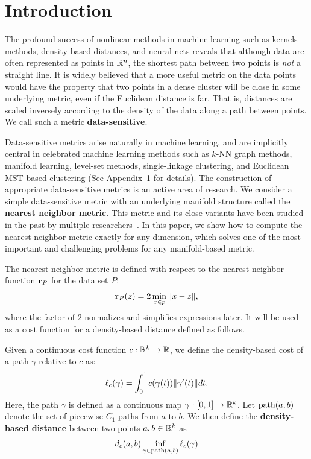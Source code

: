 \section{Introduction}

The profound success of nonlinear methods in machine learning such as kernels methods, density-based distances, and neural nets reveals that although data are often represented as points in $\mathbb{R}^n$, the shortest path between two points is \emph{not} a straight line.
It is widely believed that a more useful metric on the data points would have the property that two points in a dense cluster will be close in some underlying metric, even if the Euclidean distance is far.
That is, distances are scaled inversely according to the density of the data along a path between points.
We call such a metric \textbf{data-sensitive}.

Data-sensitive metrics arise naturally in machine learning, and are implicitly central in celebrated machine learning methods such as $k$-NN graph methods, manifold learning, level-set methods, single-linkage clustering, and Euclidean MST-based clustering (See Appendix~\ref{} for details).
The construction of appropriate data-sensitive metrics is an active area of research.
We consider a simple data-sensitive metric with an underlying manifold structure called the \textbf{nearest neighbor metric}.
This metric and its close variants have been studied in the past by multiple researchers~\cite{}.
In this paper, we show how to compute the nearest neighbor metric exactly for any dimension, which solves one of the most important and challenging problems for any manifold-based metric.

The nearest neighbor metric is defined with respect to the nearest neighbor function $\mathbf{r}_P$ for the data set $P$:
\[
\mathbf{r}_P(z) = 2\min_{x\in p} \|x-z\|,
\]
where the factor of $2$ normalizes and simplifies expressions later.
It will be used as a cost function for a density-based distance defined as follows.

\begin{definition}
Given a continuous cost function $c:\mathbb{R}^k \rightarrow \mathbb{R}$, we define the density-based
cost of a path $\gamma$ relative to $c$ as:
\[ \ell_c(\gamma) = \int_{0}^1 c(\gamma(t)) \| \gamma'(t) \|dt. \]
Here, the path $\gamma$ is defined as a continuous map $\gamma:[0,1]
\to \mathbb{R}^k$.
Let $\mathrm{path}(a,b)$ denote the set of piecewise-$C_1$ paths from $a$ to $b$.
We then define the \textbf{density-based distance} between two points $a, b \in
\mathbb{R}^k$ as
\[ d_c(a,b) \inf_{\gamma\in\mathrm{path}(a,b)} \ell_c(\gamma)\]
\end{definition}

